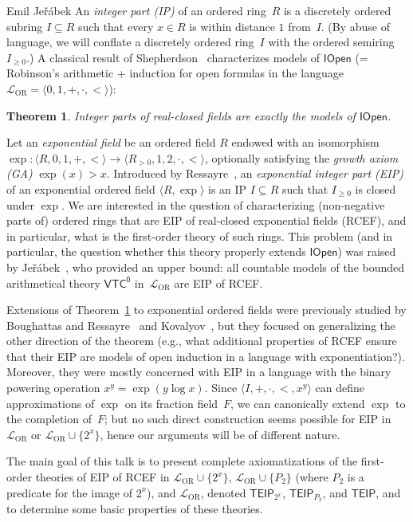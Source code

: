 \documentclass[report]{owrart}
\newcommand\p[1]{\langle#1\rangle}
\newcommand\sset{\subseteq}
\newcommand\langor{\mathcal L_{\mathrm{OR}}}
\newcommand\langp{\langor\cup\{P_2\}}
\newcommand\lange{\langor\cup\{2^x\}}
\newcommand\thry[1]{\mathsf{#1}}
\newcommand\io{\thry{IOpen}}
\newcommand\teip{\thry{TEIP}}
\newcommand\teipp{\teip_{\!P_2}}
\newcommand\teipe{\teip_{2^x}}
\newtheorem{Thm}{Theorem}
\begin{document}
\begin{report}
\begin{talk}{Emil Je\v r\'abek}
  \noindent
  An \emph{integer part (IP)} of an ordered ring~$R$ is a discretely ordered subring $I\sset R$ such that every $x\in R$
  is within distance $1$ from~$I$. (By abuse of language, we will conflate a discretely ordered ring~$I$ with the ordered
  semiring $I_{\ge0}$.) A classical result of Shepherdson~\cite{EJ:sheph} characterizes models of $\io$ (= Robinson's
  arithmetic + induction for open formulas in the language $\langor=\p{0,1,+,\cdot,{<}}$):
  \begin{Thm}\label{EJ:thm:shep}
  Integer parts of real-closed fields are exactly the models of $\io$.
  \end{Thm}
  
  Let an \emph{exponential field} be an ordered field $R$ endowed with an isomorphism
  $\exp\colon\p{R,0,1,+,{<}}\to\p{R_{>0},1,2,\cdot,{<}}$, optionally satisfying the \emph{growth axiom (GA)} $\exp(x)>x$.
  Introduced by Ressayre~\cite{EJ:ress:eip}, an \emph{exponential integer part (EIP)} of an exponential ordered field
  $\p{R,\exp}$ is an IP $I\sset R$ such that $I_{\ge0}$ is closed under $\exp$. We are interested in the question of
  characterizing (non-negative parts of) ordered rings that are EIP of real-closed exponential fields (RCEF), and in
  particular, what is the first-order theory of such rings. This problem (and in particular, the question whether this
  theory properly extends $\io$) was raised by Je\v r\'abek~\cite{EJ:ej:vtceip}, who provided an upper bound: all
  countable models of the bounded arithmetical theory $\thry{VTC^0}$
  in~$\langor$ are EIP of RCEF.
  
  Extensions of Theorem~\ref{EJ:thm:shep} to exponential ordered fields were previously studied by Boughattas and
  Ressayre~\cite{EJ:bou-ress:eip} and Kovalyov~\cite{EJ:kov:eip}, but they focused on generalizing the other direction of the
  theorem (e.g., what additional properties of RCEF ensure that their EIP are models of open induction in a language with
  exponentiation?). Moreover, they were mostly concerned with EIP in a language with the binary powering operation
  $x^y=\exp(y\log x)$. Since $\p{I,+,\cdot,<,x^y}$ can define approximations of $\exp$ on its fraction field~$F$,
  we can canonically extend $\exp$ to the completion of~$F$; but no such direct construction seems possible for EIP in
  $\langor$ or $\lange$, hence our arguments will be of different nature.
  
  The main goal of this talk is to present complete axiomatizations of the first-order theories of EIP of RCEF in
  $\lange$, $\langp$ (where $P_2$ is a predicate for the image of $2^x$), and $\langor$, denoted $\teipe$, $\teipp$, and
  $\teip$, and to determine some basic properties of these theories.
  

\end{talk}
\end{report}
\end{document}
